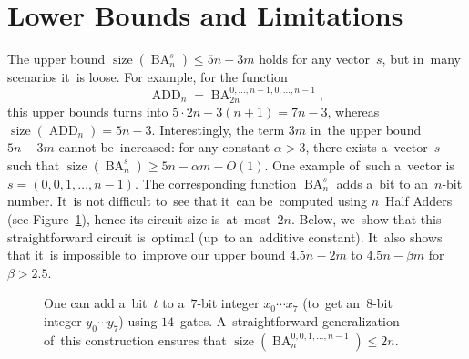 \documentclass[a4paper, UKenglish, cleveref, autoref,  thm-restate, anonymous]{lipics-v2021}
\DeclareMathOperator{\ADD}{ADD}
\DeclareMathOperator{\BA}{BA}
\DeclareMathOperator{\size}{size}
\begin{document}
    \section{Lower Bounds and Limitations}
    The upper bound $\size(\BA_n^s) \le 5n-3m$ holds for any vector~$s$, but
    in~many scenarios it~is loose. For example, for the function
    \[\ADD_n=\BA_{2n}^{0,\dotsc,n-1,0,\dotsc,n-1},\]
    this upper bounds turns into $5\cdot 2n-3(n+1)=7n-3$,
    whereas $\size(\ADD_n)=5n-3$. Interestingly, the term $3m$ in~the upper bound $5n-3m$ cannot be~increased: for any constant $\alpha > 3$, there exists
    a~vector~$s$ such that $\size(\BA_n^s) \ge 5n-\alpha m-O(1)$.
    One example of~such a~vector is~$s=(0,0,1,\dotsc,n-1)$. The corresponding function $\BA_n^s$ adds a~bit to an~$n$-bit number. It~is not difficult to~see that it~can be~computed using $n$~Half Adders (see Figure~\ref{figure:addingbit}), hence its circuit size is~at~most~$2n$. Below, we~show that this straightforward circuit is~optimal (up~to an~additive constant). It~also shows that it~is
    impossible to~improve our upper bound $4.5n-2m$ to $4.5n-\beta m$ for $\beta > 2.5$.

    \begin{figure}
        \begin{center}
        \end{center}
        \caption{One can add a~bit~$t$ to a~$7$-bit integer $x_0\dotsb x_7$ (to~get
            an~$8$-bit integer $y_0\dotsb y_7$) using $14$~gates. A~straightforward
            generalization of~this construction ensures that $\size(\BA_n^{0,0,1,\dotsc, n-1}) \le 2n$.}
        \label{figure:addingbit}
    \end{figure}
\end{document}
